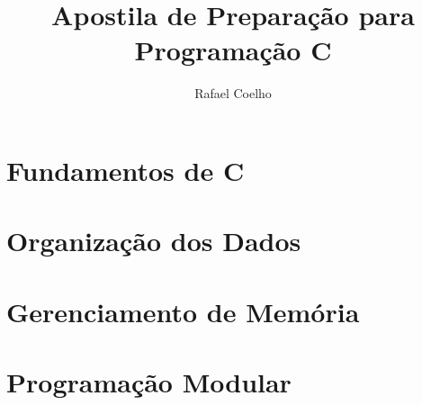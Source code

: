 \documentclass[12pt,a4paper,oneside]{extreport}
\title{\huge Apostila de Preparação para Programação \textbf{C}}
\author{Rafael Coelho}
\begin{document}
\maketitle






\tableofcontents
\clearpage



\part{Fundamentos de C}







\part{Organização dos Dados}






\part{Gerenciamento de Memória}






\part{Programação Modular}




\end{document}
